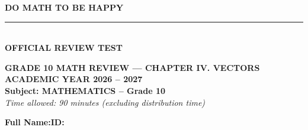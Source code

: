 \documentclass[10pt,a4paper]{article}
\begin{document}
\noindent
\begin{minipage}[c]{0.38\textwidth}
    \centering
    \textbf{DO MATH TO BE HAPPY}\\[-2pt]
    \rule{3.2cm}{0.6pt}\\[2pt]
    \textbf{OFFICIAL REVIEW TEST}
\end{minipage}\hfill
\begin{minipage}[c]{0.52\textwidth}
    \centering
    \textbf{GRADE 10 MATH REVIEW — CHAPTER IV. VECTORS}\\[1pt]
    \textbf{ACADEMIC YEAR 2026 -- 2027}\\[1pt]
    \textbf{Subject: MATHEMATICS -- Grade 10}\\
    \textit{\small Time allowed: 90 minutes (excluding distribution time)}
\end{minipage}

\vspace{0.05cm}
\noindent
\begin{minipage}[b]{0.78\textwidth}
    \textbf{Full Name:}\dotfill\textbf{ID:}\makebox[3.5cm]{\dotfill}
\end{minipage}\hfill
\begin{minipage}[b]{0.20\textwidth}
    \hfill
    \setlength{\fboxrule}{0.8pt}%
\end{minipage}
\vspace{0.05cm}
\end{document}
